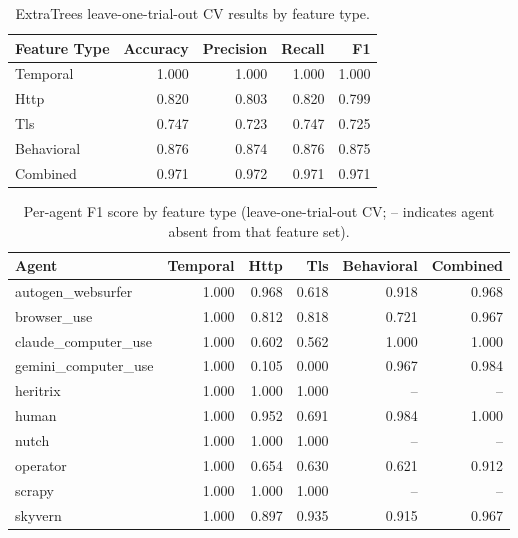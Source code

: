 \begin{table}[ht]
\centering
\caption{ExtraTrees leave-one-trial-out CV results by feature type.}
\label{tab:feature_type_results}
\begin{tabular}{lrrrr}
\toprule
Feature Type & Accuracy & Precision & Recall & F1 \\
\midrule
Temporal & 1.000 & 1.000 & 1.000 & 1.000 \\
Http & 0.820 & 0.803 & 0.820 & 0.799 \\
Tls & 0.747 & 0.723 & 0.747 & 0.725 \\
Behavioral & 0.876 & 0.874 & 0.876 & 0.875 \\
Combined & 0.971 & 0.972 & 0.971 & 0.971 \\
\bottomrule
\end{tabular}
\end{table}

\begin{table}[ht]
\centering
\caption{Per-agent F1 score by feature type (leave-one-trial-out CV; -- indicates agent absent from that feature set).}
\label{tab:agent_f1_results}
\begin{tabular}{lrrrrr}
\toprule
Agent & Temporal & Http & Tls & Behavioral & Combined \\
\midrule
autogen\_websurfer & 1.000 & 0.968 & 0.618 & 0.918 & 0.968 \\
browser\_use & 1.000 & 0.812 & 0.818 & 0.721 & 0.967 \\
claude\_computer\_use & 1.000 & 0.602 & 0.562 & 1.000 & 1.000 \\
gemini\_computer\_use & 1.000 & 0.105 & 0.000 & 0.967 & 0.984 \\
heritrix & 1.000 & 1.000 & 1.000 & -- & -- \\
human & 1.000 & 0.952 & 0.691 & 0.984 & 1.000 \\
nutch & 1.000 & 1.000 & 1.000 & -- & -- \\
operator & 1.000 & 0.654 & 0.630 & 0.621 & 0.912 \\
scrapy & 1.000 & 1.000 & 1.000 & -- & -- \\
skyvern & 1.000 & 0.897 & 0.935 & 0.915 & 0.967 \\
\bottomrule
\end{tabular}
\end{table}
